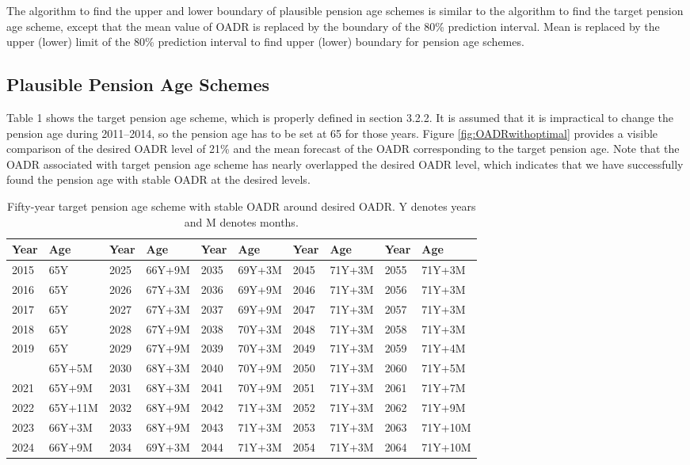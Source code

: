 \documentclass[11pt,a4paper,]{article}
\begin{document}
The algorithm to find the upper and lower boundary of plausible pension
age schemes is similar to the algorithm to find the target pension age
scheme, except that the mean value of OADR is replaced by the boundary
of the 80\% prediction interval. Mean is replaced by the upper (lower)
limit of the 80\% prediction interval to find upper (lower) boundary for
pension age schemes.

\subsection{Plausible Pension Age
Schemes}\label{plausible-pension-age-schemes}

Table 1 shows the target pension age scheme, which is properly defined
in section 3.2.2. It is assumed that it is impractical to change the
pension age during 2011--2014, so the pension age has to be set at 65
for those years. Figure \ref{fig:OADRwithoptimal} provides a visible
comparison of the desired OADR level of 21\% and the mean forecast of
the OADR corresponding to the target pension age. Note that the OADR
associated with target pension age scheme has nearly overlapped the
desired OADR level, which indicates that we have successfully found the
pension age with stable OADR at the desired
levels.

\begin{table}[t]

\caption{\label{tab:pensionagetables}Fifty-year target pension age scheme with stable OADR around desired OADR. Y denotes years and M denotes months.}
\centering
\begin{tabular}{llllllllll}
\toprule
Year & Age & Year & Age & Year & Age & Year & Age & Year & Age\\
\midrule
2015 & 65Y & 2025 & 66Y+9M & 2035 & 69Y+3M & 2045 & 71Y+3M & 2055 & 71Y+3M\\
2016 & 65Y & 2026 & 67Y+3M & 2036 & 69Y+9M & 2046 & 71Y+3M & 2056 & 71Y+3M\\
2017 & 65Y & 2027 & 67Y+3M & 2037 & 69Y+9M & 2047 & 71Y+3M & 2057 & 71Y+3M\\
2018 & 65Y & 2028 & 67Y+9M & 2038 & 70Y+3M & 2048 & 71Y+3M & 2058 & 71Y+3M\\
2019 & 65Y & 2029 & 67Y+9M & 2039 & 70Y+3M & 2049 & 71Y+3M & 2059 & 71Y+4M\\
\addlinespace
2020 & 65Y+5M & 2030 & 68Y+3M & 2040 & 70Y+9M & 2050 & 71Y+3M & 2060 & 71Y+5M\\
2021 & 65Y+9M & 2031 & 68Y+3M & 2041 & 70Y+9M & 2051 & 71Y+3M & 2061 & 71Y+7M\\
2022 & 65Y+11M & 2032 & 68Y+9M & 2042 & 71Y+3M & 2052 & 71Y+3M & 2062 & 71Y+9M\\
2023 & 66Y+3M & 2033 & 68Y+9M & 2043 & 71Y+3M & 2053 & 71Y+3M & 2063 & 71Y+10M\\
2024 & 66Y+9M & 2034 & 69Y+3M & 2044 & 71Y+3M & 2054 & 71Y+3M & 2064 & 71Y+10M\\
\bottomrule
\end{tabular}
\end{table}
\end{document}
